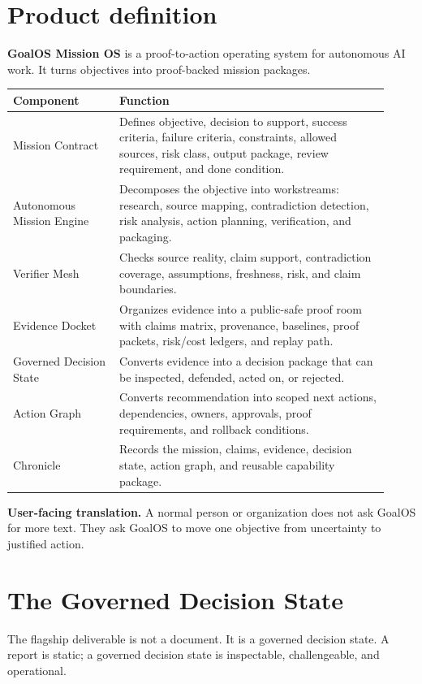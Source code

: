 \documentclass[11pt]{article}
\begin{document}
\section{Product definition}
\textbf{GoalOS Mission OS} is a proof-to-action operating system for autonomous AI work. It turns objectives into proof-backed mission packages.

\begin{longtable}{p{0.26\linewidth}p{0.66\linewidth}}
\toprule
\textbf{Component} & \textbf{Function} \\
\midrule
Mission Contract & Defines objective, decision to support, success criteria, failure criteria, constraints, allowed sources, risk class, output package, review requirement, and done condition. \\
Autonomous Mission Engine & Decomposes the objective into workstreams: research, source mapping, contradiction detection, risk analysis, action planning, verification, and packaging. \\
Verifier Mesh & Checks source reality, claim support, contradiction coverage, assumptions, freshness, risk, and claim boundaries. \\
Evidence Docket & Organizes evidence into a public-safe proof room with claims matrix, provenance, baselines, proof packets, risk/cost ledgers, and replay path. \\
Governed Decision State & Converts evidence into a decision package that can be inspected, defended, acted on, or rejected. \\
Action Graph & Converts recommendation into scoped next actions, dependencies, owners, approvals, proof requirements, and rollback conditions. \\
Chronicle & Records the mission, claims, evidence, decision state, action graph, and reusable capability package. \\
\bottomrule
\end{longtable}

\begin{bluebox}
\textbf{User-facing translation.} A normal person or organization does not ask GoalOS for more text. They ask GoalOS to move one objective from uncertainty to justified action.
\end{bluebox}

\section{The Governed Decision State}
The flagship deliverable is not a document. It is a governed decision state. A report is static; a governed decision state is inspectable, challengeable, and operational.
\end{document}

